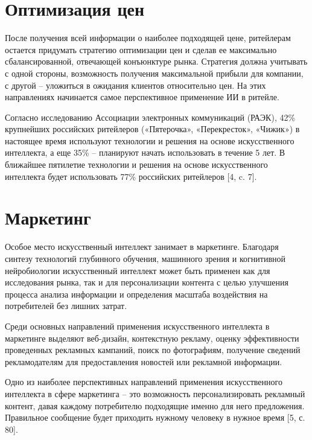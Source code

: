 \documentclass{article}
\begin{document}
\section{Оптимизация цен}
\normalsize{\hspace{5mm}После получения всей информации о наиболее подходящей цене, ритейлерам остается придумать стратегию оптимизации цен и сделав ее максимально сбалансированной, отвечающей конъюнктуре рынка. Стратегия должна учитывать с одной стороны, возможность получения максимальной прибыли для компании, с другой – уложиться в ожидания клиентов относительно цен. На этих направлениях начинается самое перспективное применение ИИ в ритейле.

Согласно исследованию Ассоциации электронных коммуникаций (РАЭК), 42\% крупнейших российских ритейлеров («Пятерочка», «Перекресток», «Чижик») в настоящее время используют технологии и решения на основе искусственного интеллекта, а еще 35\% – планируют начать использовать в течение 5 лет. В ближайшее пятилетие технологии и решения на основе искусственного интеллекта будет использовать 77\% российских ритейлеров [4, c. 7].}
\section{Маркетинг}
\normalsize{\hspace{5mm}Особое место искусственный интеллект занимает в маркетинге. Благодаря синтезу технологий глубинного обучения, машинного зрения и когнитивной нейробиологии искусственный интеллект может быть применен как для исследования рынка, так и для персонализации контента с целью улучшения процесса анализа информации и определения масштаба воздействия на потребителей без лишних затрат.

Среди основных направлений применения искусственного интеллекта в маркетинге выделяют веб-дизайн, контекстную рекламу, оценку эффективности проведенных рекламных кампаний, поиск по фотографиям, получение сведений рекламодателям для предоставления новостей или рекламной информации.

Одно из наиболее перспективных направлений применения искусственного интеллекта в сфере маркетинга – это возможность персонализировать рекламный контент, давая каждому потребителю подходящие именно для него предложения. Правильное сообщение будет приходить нужному человеку в нужное время [5, с. 80].}
\end{document}
